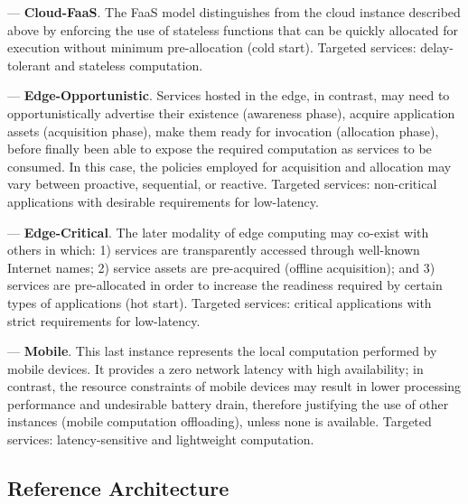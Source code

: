 --- \textbf{Cloud-FaaS}. The FaaS model distinguishes from the cloud instance described above by enforcing the use of stateless functions that can be quickly allocated for execution without minimum pre-allocation (cold start). Targeted services: delay-tolerant and stateless computation.

--- \textbf{Edge-Opportunistic}. Services hosted in the edge, in contrast, may need to opportunistically advertise their existence (awareness phase), acquire application assets (acquisition phase), make them ready for invocation (allocation phase), before finally been able to expose the required computation as services to be consumed. In this case, the policies employed for acquisition and allocation may vary between proactive, sequential, or reactive. Targeted services: non-critical applications with desirable requirements for low-latency.

--- \textbf{Edge-Critical}. The later modality of edge computing may co-exist with others in which: 1) services are transparently accessed through well-known Internet names; 2) service assets are pre-acquired (offline acquisition); and 3) services are pre-allocated in order to increase the readiness required by certain types of applications (hot start). Targeted services: critical applications with strict requirements for low-latency.

--- \textbf{Mobile}. This last instance represents the local computation performed by mobile devices. It provides a zero network latency with high availability; in contrast, the resource constraints of mobile devices may result in lower processing performance and undesirable battery drain, therefore justifying the use of other instances (mobile computation offloading), unless none is available. Targeted services: latency-sensitive and lightweight computation.




\subsection{Reference Architecture}

